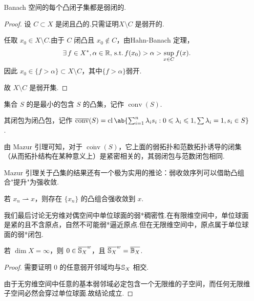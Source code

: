 \begin{lemma}
    Banach 空间的每个凸闭子集都是弱闭的.
\end{lemma}
\begin{proof}
    设 $C \subset X$ 是闭且凸的.只需证明$X \setminus C$ 是弱开的.\par
    任取 $x_0 \in X \setminus C$.由于 $C$ 闭凸且 $x_0 \notin C$，由Hahn-Banach 定理，\begin{equation*}
        \exists\, f \in X^*, \alpha \in \mathbb{R},\operatorname{\,\text{s.t.}} f(x_0) > \alpha > \sup_{x \in C} f(x).
    \end{equation*}
    因此 $x_0 \in \{f> \alpha\} \subset X \setminus C$，其中$\{f>\alpha\}$弱开.\par
    故 $X \setminus C$ 是弱开集.
\end{proof}

\begin{definition}[凸包]
    集合 $S$ 的是最小的包含 $S$ 的凸集，记作 $\operatorname{conv}(S)$.\par
    其闭包为闭凸包，记作 $\overline{\operatorname{conv}}(S) = \operatorname{cl} \ab\{ \sum_{i=1}^n \lambda_i s_i : 0 \leq \lambda_i \leq 1, \sum \lambda_i = 1, s_i \in S \}$.
\end{definition}
\begin{note}
    由 Mazur 引理可知，对于 $\overline{\operatorname{conv}}(S)$，它上面的弱拓扑和范数拓扑诱导的闭集（从而拓扑结构在某种意义上）是紧密相关的，其弱闭包与范数闭包相同.
\end{note}

Mazur 引理关于凸集的结果还有一个极为实用的推论：弱收敛序列可以借助凸组合"提升"为强收敛.

\begin{corollary}
    若 $x_n \rightharpoonup x$，则存在 $\{x_n\}$ 的凸组合强收敛到 $x$.
\end{corollary}

我们最后讨论无穷维对偶空间中单位球面的弱*稠密性.在有限维空间中，单位球面是紧的且不含原点，自然不可能弱*逼近原点.但在无限维空间中，原点属于单位球面的弱*闭包.

\begin{theorem}
    若 $\dim X = \infty$，则 $0 \in \overline{\mathbb{S}_{X}}^{w}$，且 $\overline{\mathbb{S}_{X}}^{w} = \overline{\mathbb{B}_X}$.
\end{theorem}
\begin{proof}
    需要证明 $0$ 的任意弱开邻域均与$\mathbb{S}_{X}$ 相交.\par
    由于无穷维空间中任意的基本弱邻域必定包含一个无限维的子空间，而任何无限维子空间必然会穿过单位球面.故结论成立.
\end{proof}

